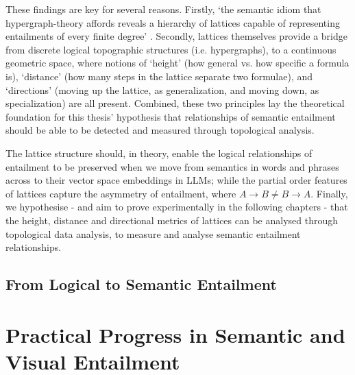 \documentclass[12pt,twoside]{report}
\begin{document}
These findings are key for several reasons. Firstly, `the semantic idiom that hypergraph-theory affords reveals a hierarchy of lattices capable of representing entailments of every finite degree' \cite{leibnizianAnalysis}. Secondly, lattices themselves provide a bridge from discrete logical topographic structures (i.e. hypergraphs), to a continuous geometric space, where notions of `height' (how general vs. how specific a formula is), `distance' (how many steps in the lattice separate two formulae), and `directions' (moving up the lattice, as generalization, and moving down, as specialization) are all present. Combined, these two principles lay the theoretical foundation for this thesis' hypothesis that relationships of semantic entailment should be able to be detected and measured through topological analysis. \newline \par

The lattice structure should, in theory, enable the logical relationships of entailment to be preserved when we move from semantics in words and phrases across to their vector space embeddings in LLMs; while the partial order features of lattices capture the asymmetry of entailment, where $A \rightarrow B \neq B \rightarrow A$. Finally, we hypothesise - and aim to prove experimentally in the following chapters - that the height, distance and directional metrics of lattices can be analysed through topological data analysis, to measure and analyse semantic entailment relationships.


\subsection{From Logical to Semantic Entailment}








\section{Practical Progress in Semantic and Visual Entailment}
\end{document}
